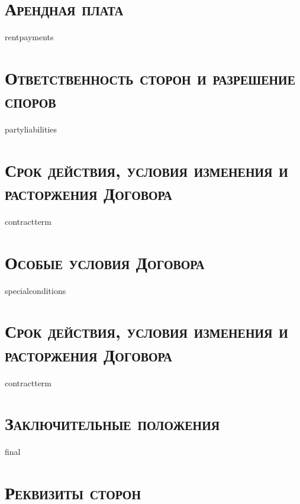 {{{{{{\section{\large \textbf{\textsc{Арендная плата}}}
{{rentpayments}}

\section{\large \textbf{\textsc{Ответственность сторон и разрешение споров}}}
{{partyliabilities}}

\section{\large \textbf{\textsc{Срок действия, условия изменения и расторжения Договора}}}
{{contractterm}}

\section{\large \textbf{\textsc{Особые условия Договора}}}
{{specialconditions}}

\section{\large \textbf{\textsc{Срок действия, условия изменения и расторжения Договора}}}
{{contractterm}}

\section{\large \textbf{\textsc{Заключительные положения}}}
{{final}}

\section{\large \textbf{\textsc{Реквизиты сторон}}}
\thispagestyle{empty}

\begin{tabularx}{\textwidth}{ X@{\hskip 0.5in} X }


\end{tabularx}}}}}}}
